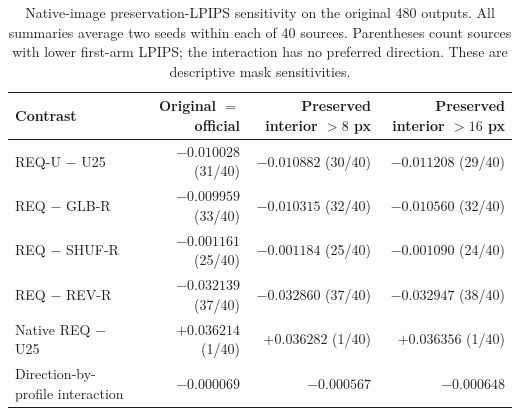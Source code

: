 \begin{table}[!t]
\centering\footnotesize
\caption{Native-image preservation-LPIPS sensitivity on the original 480 outputs. All summaries average two seeds within each of 40 sources. Parentheses count sources with lower first-arm LPIPS; the interaction has no preferred direction. These are descriptive mask sensitivities.}
\label{tab:r89-native-boundary}
\begin{tabular}{lrrr}
\toprule
Contrast & Original $=$ official & Preserved interior $>8$ px & Preserved interior $>16$ px\\
\midrule
REQ-U $-$ U25 & $-0.010028$ (31/40) & $-0.010882$ (30/40) & $-0.011208$ (29/40) \\
REQ $-$ GLB-R & $-0.009959$ (33/40) & $-0.010315$ (32/40) & $-0.010560$ (32/40) \\
REQ $-$ SHUF-R & $-0.001161$ (25/40) & $-0.001184$ (25/40) & $-0.001090$ (24/40) \\
REQ $-$ REV-R & $-0.032139$ (37/40) & $-0.032860$ (37/40) & $-0.032947$ (38/40) \\
Native REQ $-$ U25 & $+0.036214$ (1/40) & $+0.036282$ (1/40) & $+0.036356$ (1/40) \\
Direction-by-profile interaction & $-0.000069$ & $-0.000567$ & $-0.000648$ \\
\bottomrule
\end{tabular}
\end{table}

